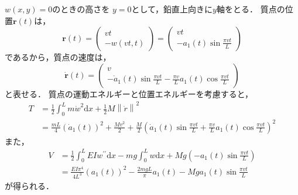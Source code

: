 \documentclass[a4paper]{jsarticle}
\begin{document}
\subsubsection{}
$w(x, y) = 0$のときの高さを
$y = 0$として，鉛直上向きに$y$軸をとる．
質点の位置$\boldsymbol{r}(t)$は，
\begin{equation}
  \boldsymbol{r}(t) =
  \begin{pmatrix}
    vt \\ -w(vt ,t)
  \end{pmatrix} =
  \begin{pmatrix}
    vt \\ -a_1(t) \sin \frac{\pi v t}{L}
  \end{pmatrix}
\end{equation}
であるから，質点の速度は，
\begin{equation}
  \dot{\boldsymbol{r}}(t) =
  \begin{pmatrix}
    v \\
    -\dot{a}_1(t) \sin \frac{\pi v t}{L} -\frac{\pi v}{L} a_1(t) \cos \frac{\pi v t}{L}
  \end{pmatrix}
\end{equation}
と表せる．
質点の運動エネルギーと位置エネルギーを考慮すると，
\begin{equation}
  \begin{aligned}
    T & = \frac{1}{2} \int_0^L m \dot{w}^2 \mathrm{d} x
    + \frac{1}{2} M \left\| \dot{r} \right\|^2          \\
      & = \frac{mL}{4} \left(\dot{a}_1(t)\right)^2
    + \frac{M v^2}{2}
    + \frac{M}{2}
    \left(\dot{a}_1(t) \sin \frac{\pi v t}{L}
    + \frac{\pi v}{L} a_1(t) \cos \frac{\pi v t}{L}\right)^2
  \end{aligned}
\end{equation}
また，
\begin{equation}
  \begin{aligned}
    V & = \frac{1}{2} \int_0^L E I w^{\prime\prime} \mathrm{d} x
    - m g \int_0^L w \mathrm{d} x
    + M g \left(-a_1(t) \sin \frac{\pi v t}{L}\right)            \\
      & = \frac{E I \pi^4}{4 L^3} \left(a_1(t)\right)^2
    - \frac{2 m g L}{\pi} a_1(t)
    - M g a_1(t) \sin \frac{\pi v t} {L}
  \end{aligned}
\end{equation}
が得られる．
\end{document}

